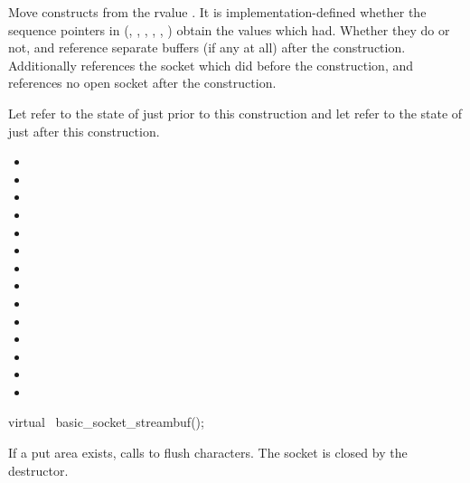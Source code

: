 \begin{itemdescr}
\pnum
\effects Move constructs from the rvalue . It is implementation-defined whether the sequence pointers in  (, , , , , ) obtain the values which  had. Whether they do or not,  and  reference separate buffers (if any at all) after the construction. Additionally  references the socket which  did before the construction, and  references no open socket after the construction.

\pnum
\postconditions Let  refer to the state of  just prior to this construction and let  refer to the state of  just after this construction.
\begin{itemize}
\item
{}
\item
{}
\item
{}
\item
{}
\item
{}
\item
{}
\item
{}
\item
{}
\item
{}
\item
{}
\item
{}
\item
{}
\item
{}
\item
{}
\end{itemize}
\end{itemdescr}

\begin{itemdecl}
virtual ~basic_socket_streambuf();
\end{itemdecl}

\begin{itemdescr}
\pnum
\effects If a put area exists, calls  to flush characters. \enternote The socket is closed by the  destructor. \exitnote
\end{itemdescr}


